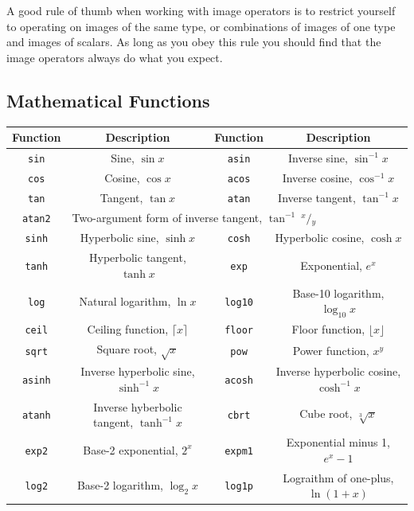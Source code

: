 A good rule of thumb when working with image operators is to restrict
yourself to operating on images of the same type, or combinations of
images of one type and images of scalars.  As long as you obey this
rule you should find that the image operators always do what you
expect.

\subsection{Mathematical Functions}

\begin{table}[t]\begin{centering}
\renewcommand\arraystretch{1.2}
\begin{tabular}{|c|c|c|c|} \hline
Function & Description & Function & Description \\ \hline \hline
\verb#sin# & Sine, $\sin x$ & \verb#asin# & Inverse sine, $\sin^{-1} x$ \\ \hline
\verb#cos# & Cosine, $\cos x$ & \verb#acos# & Inverse cosine, $\cos^{-1} x$ \\ \hline
\verb#tan# & Tangent, $\tan x$ & \verb#atan# & Inverse tangent, $\tan^{-1} x$ \\ \hline
\verb#atan2# & \multicolumn{3}{|l|}{Two-argument form of inverse tangent, $\tan^{-1}\!\!\ ^x\!/\!_y$ } \\ \hline
\verb#sinh# & Hyperbolic sine, $\sinh x$ & \verb#cosh# & Hyperbolic cosine, $\cosh x$ \\ \hline
\verb#tanh# & Hyperbolic tangent, $\tanh x$ & \verb#exp# & Exponential, $e^x$ \\ \hline
\verb#log# & Natural logarithm, $\ln x$ & \verb#log10# & Base-10 logarithm, $\log_{10} x$ \\ \hline
\verb#ceil# & Ceiling function, $\lceil x \rceil$ & \verb#floor# & Floor function, $\lfloor x \rfloor$ \\ \hline
\verb#sqrt# & Square root, $\sqrt{x}$ & \verb#pow# & Power function, $x^y$ \\ \hline
\hline
\verb#asinh# & Inverse hyperbolic sine, $\sinh^{-1} x$ & \verb#acosh# & Inverse hyperbolic cosine, $\cosh^{-1} x$ \\ \hline
\verb#atanh# & Inverse hyberbolic tangent, $\tanh^{-1} x$ & \verb#cbrt# & Cube root, $\sqrt[3]{x}$ \\ \hline
\verb#exp2# & Base-2 exponential, $2^x$ & \verb#expm1# & Exponential minus 1, $e^x-1$ \\ \hline
\verb#log2# & Base-2 logarithm, $\log_2 x$ & \verb#log1p# & Lograithm of one-plus, $\ln (1+x)$ \\ \hline

\end{tabular}
\end{centering}
\end{table}

